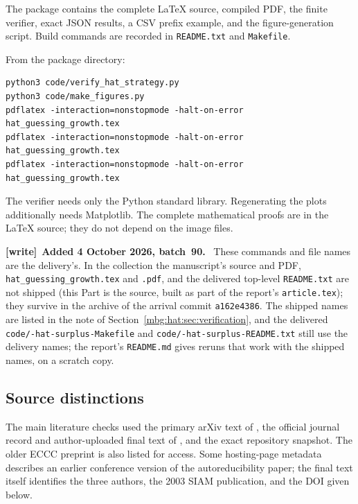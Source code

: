 \documentclass[11pt,letterpaper]{article}
\theoremstyle{definition}
\newenvironment{writenote}[1][]{\par\smallskip\begingroup\small
 \noindent\textbf{[write]}\if\relax\detokenize{#1}\relax\else~\textbf{#1.}\fi\ }%
 {\par\endgroup\smallskip}
\begin{document}
The package contains the complete LaTeX source, compiled PDF,
the finite verifier, exact JSON results, a CSV prefix example,
and the figure-generation script. Build commands are recorded
in \texttt{README.txt} and \texttt{Makefile}.

From the package directory:
\begin{lstlisting}
python3 code/verify_hat_strategy.py
python3 code/make_figures.py
pdflatex -interaction=nonstopmode -halt-on-error hat_guessing_growth.tex
pdflatex -interaction=nonstopmode -halt-on-error hat_guessing_growth.tex
pdflatex -interaction=nonstopmode -halt-on-error hat_guessing_growth.tex
\end{lstlisting}
The verifier needs only the Python standard library.
Regenerating the plots additionally needs Matplotlib.
The complete mathematical proofs are in the LaTeX source;
they do not depend on the image files.

\begin{writenote}[Added 4 October 2026, batch~90]
These commands and file names are the delivery's. In the collection the manuscript's source and PDF, \texttt{hat\_\allowbreak guessing\_\allowbreak growth.tex} and \texttt{.pdf}, and the delivered top-level \texttt{README.txt} are not shipped (this Part is the source, built as part of the report's \texttt{article.tex}); they survive in the archive of the arrival commit \texttt{a162e4386}. The shipped names are listed in the note of Section~\ref{mbg:hat:sec:verification}, and the delivered \texttt{code/-hat-surplus-\allowbreak Makefile} and \texttt{code/-hat-surplus-\allowbreak README.txt} still use the delivery names; the report's \texttt{README.md} gives reruns that work with the shipped names, on a scratch copy.
\end{writenote}

\subsection{Source distinctions}

The main literature checks used the primary arXiv text of
\cite{hat:Eldredge}, the official journal record and author-uploaded
final text of \cite{hat:EMV}, and the exact repository snapshot.
The older ECCC preprint is also listed for access.
Some hosting-page metadata describes an earlier conference
version of the autoreducibility paper; the final text itself
identifies the three authors, the 2003 SIAM publication, and
the DOI given below.
\end{document}

